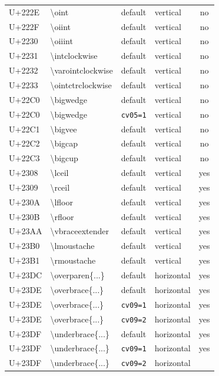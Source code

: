 \documentclass[10pt]{article}
\newcommand\feat[1]{\texttt{#1}}
\begin{document}
\begin{longtable}{>{\ttfamily}l>{\ttfamily}lllc}
U+222E & \textbackslash{}oint & default & vertical & no \\
U+222F & \textbackslash{}oiint & default & vertical & no \\
U+2230 & \textbackslash{}oiiint & default & vertical & no \\
U+2231 & \textbackslash{}intclockwise & default & vertical & no \\
U+2232 & \textbackslash{}varointclockwise & default & vertical & no \\
U+2233 & \textbackslash{}ointctrclockwise & default & vertical & no \\
U+22C0 & \textbackslash{}bigwedge & default & vertical & no \\
U+22C0 & \textbackslash{}bigwedge & \feat{cv05=1} & vertical & no \\
U+22C1 & \textbackslash{}bigvee & default & vertical & no \\
U+22C2 & \textbackslash{}bigcap & default & vertical & no \\
U+22C3 & \textbackslash{}bigcup & default & vertical & no \\
U+2308 & \textbackslash{}lceil & default & vertical & yes \\
U+2309 & \textbackslash{}rceil & default & vertical & yes \\
U+230A & \textbackslash{}lfloor & default & vertical & yes \\
U+230B & \textbackslash{}rfloor & default & vertical & yes \\
U+23AA & \textbackslash{}vbraceextender & default & vertical & yes \\
U+23B0 & \textbackslash{}lmoustache & default & vertical & yes \\
U+23B1 & \textbackslash{}rmoustache & default & vertical & yes \\
U+23DC & \textbackslash{}overparen\{...\} & default & horizontal & yes \\
U+23DE & \textbackslash{}overbrace\{...\} & default & horizontal & yes \\
U+23DE & \textbackslash{}overbrace\{...\} & \feat{cv09=1} & horizontal & yes \\
U+23DE & \textbackslash{}overbrace\{...\} & \feat{cv09=2} & horizontal & yes \\
U+23DF & \textbackslash{}underbrace\{...\} & default & horizontal & yes \\
U+23DF & \textbackslash{}underbrace\{...\} & \feat{cv09=1} & horizontal
& yes \\
U+23DF & \textbackslash{}underbrace\{...\} & \feat{cv09=2} & horizontal

\end{longtable}
\end{document}

